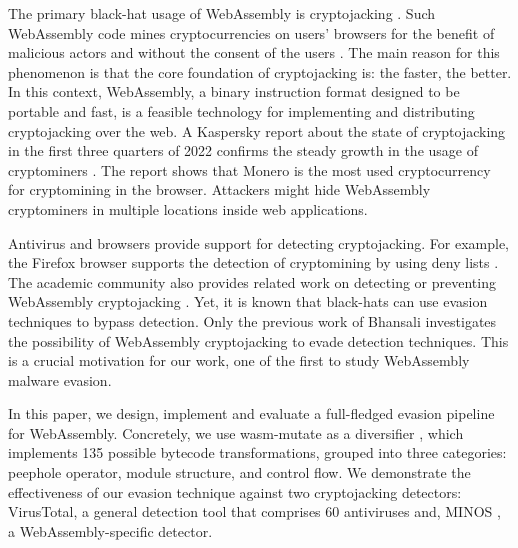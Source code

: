 

The primary black-hat usage of WebAssembly is cryptojacking \cite{10.1145/3488932.3517411}. 
Such WebAssembly code mines cryptocurrencies on users' browsers for the benefit of malicious actors and without the consent of the users \cite{ 10.1145/3339252.3339261}.
The main reason for this phenomenon is that the core foundation of cryptojacking is: the faster, the better.
In this context, WebAssembly, a binary instruction format designed to be portable and fast, is a feasible technology for implementing and distributing cryptojacking over the web.
A Kaspersky report about the state of cryptojacking in the first three quarters of 2022 confirms the steady growth in the usage of cryptominers \cite{kasperksy}.
The report shows that Monero \cite{monero} is the most used cryptocurrency for cryptomining in the browser.
Attackers might hide WebAssembly cryptominers \cite{9566204} in multiple locations inside web applications.

Antivirus and browsers provide support for detecting cryptojacking. 
For example, the Firefox browser supports the detection of cryptomining by using deny lists \cite{firefoxcrypto}.
The academic community also provides related work on detecting or preventing WebAssembly cryptojacking \cite{SEISMIC, minos, coinspy, MineThrotle, outgard,9286112}.
Yet, it is known that black-hats can use evasion techniques to bypass detection.
Only the previous work of Bhansali \etal \cite{10.1145/3507657.3528560} investigates the possibility of WebAssembly cryptojacking to evade detection techniques. This is a crucial motivation for our work, one of the first to study WebAssembly malware evasion.







In this paper, we design, implement and evaluate a  full-fledged evasion pipeline for WebAssembly.
Concretely, we use wasm-mutate as a diversifier \cite{wasm-mutate}, which implements 135 possible bytecode transformations, grouped into three categories: peephole operator, module structure, and control flow.
We demonstrate the effectiveness of our evasion technique against two cryptojacking detectors: VirusTotal, a general detection tool that comprises 60 antiviruses and, MINOS \cite{minos}, a WebAssembly-specific detector.



